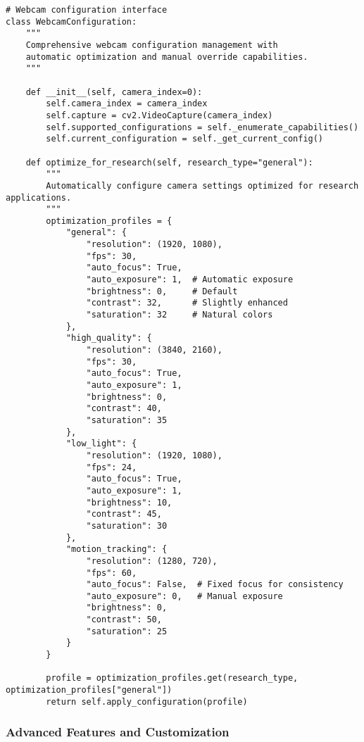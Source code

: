 \documentclass[12pt,a4paper]{article}
\begin{document}
\begin{verbatim}
# Webcam configuration interface
class WebcamConfiguration:
    """
    Comprehensive webcam configuration management with
    automatic optimization and manual override capabilities.
    """
    
    def __init__(self, camera_index=0):
        self.camera_index = camera_index
        self.capture = cv2.VideoCapture(camera_index)
        self.supported_configurations = self._enumerate_capabilities()
        self.current_configuration = self._get_current_config()
        
    def optimize_for_research(self, research_type="general"):
        """
        Automatically configure camera settings optimized for research applications.
        """
        optimization_profiles = {
            "general": {
                "resolution": (1920, 1080),
                "fps": 30,
                "auto_focus": True,
                "auto_exposure": 1,  # Automatic exposure
                "brightness": 0,     # Default
                "contrast": 32,      # Slightly enhanced
                "saturation": 32     # Natural colors
            },
            "high_quality": {
                "resolution": (3840, 2160),
                "fps": 30,
                "auto_focus": True,
                "auto_exposure": 1,
                "brightness": 0,
                "contrast": 40,
                "saturation": 35
            },
            "low_light": {
                "resolution": (1920, 1080),
                "fps": 24,
                "auto_focus": True,
                "auto_exposure": 1,
                "brightness": 10,
                "contrast": 45,
                "saturation": 30
            },
            "motion_tracking": {
                "resolution": (1280, 720),
                "fps": 60,
                "auto_focus": False,  # Fixed focus for consistency
                "auto_exposure": 0,   # Manual exposure
                "brightness": 0,
                "contrast": 50,
                "saturation": 25
            }
        }
        
        profile = optimization_profiles.get(research_type, optimization_profiles["general"])
        return self.apply_configuration(profile)
\end{verbatim}

\subsubsection{Advanced Features and Customization}
\end{document}
